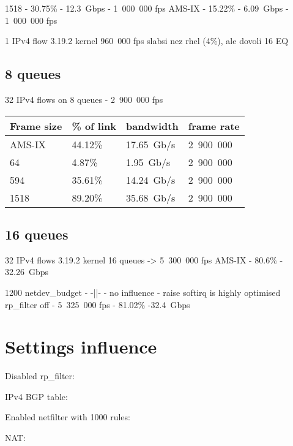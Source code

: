 1518 - 30.75\% - 12.3~Gbps - 1~000~000 fps
AMS-IX - 15.22\% - 6.09~Gbps - 1~000~000 fps



1 IPv4 flow 3.19.2 kernel
960~000 fps
slabsi nez rhel (4\%), ale dovoli 16 EQ

\subsection{8 queues}
32 IPv4 flows on 8 queues - 2~900~000 fps
\begin{tabular}{ | l | l | l | l | }
\hline
Frame size & \% of link & bandwidth & frame rate \\
\hline
AMS-IX & 44.12\% & 17.65~Gb/s & 2~900~000 \\ %
64     &  4.87\% &  1.95~Gb/s & 2~900~000 \\ %
594    & 35.61\% & 14.24~Gb/s & 2~900~000 \\ %
1518   & 89.20\% & 35.68~Gb/s & 2~900~000 \\ %
\hline
\end{tabular}

\subsection{16 queues}
32 IPv4 flows 3.19.2 kernel
16 queues -> 5~300~000 fps
AMS-IX - 80.6\% - 32.26~Gbps

1200 netdev\_budget - -||- - no influence - raise softirq is highly optimised
rp\_filter off - 5~325~000 fps - 81.02\% -32.4~Gbps




\section{Settings influence}
Disabled rp\_filter:

IPv4 BGP table:

Enabled netfilter with 1000 rules:

NAT:

